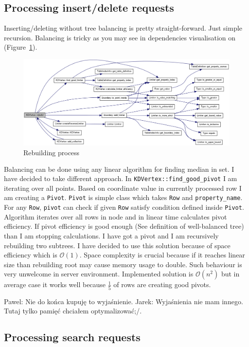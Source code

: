 \documentclass[10pt,a4paper]{article}
\newcommand{\pawel}[1]{\noindent\colorbox{myRed}{Pawel: #1}}
\newcommand{\jarek}[1]{\noindent\colorbox{myYellow}{Jarek: #1}}
\newcommand{\Oh}{\mathcal{O}}
\begin{document}
\subsection{Processing insert/delete requests}

Inserting/deleting without tree balancing is pretty straight-forward. Just simple recursion. Balancing is tricky as you may see in dependencies visualisation on (Figure~\ref{fig:rebuild}).

\begin{figure}
\centering
  \includegraphics[width=16cm]{rebuild}
  \caption{Rebuilding process}
  \label{fig:rebuild}
\end{figure}

Balancing can be done using any linear algorithm for finding median in set. I have decided to take different approach. In \verb|KDVertex::find_good_pivot| I am iterating over all points. Based on coordinate value in currently processed row I am creating a \verb|Pivot|. \verb|Pivot| is simple class which takes \verb|Row| and \verb|property_name|. For any \verb|Row|, \verb|pivot| can check if given \verb|Row| satisfy condition defined inside \verb|Pivot|. Algorithm iterates over all rows in node and in linear time calculates pivot efficiency. If pivot efficiency is good enough (See definition of well-balanced tree) than I am stopping calculations. I have got a pivot and I am recursively rebuilding two subtrees. I have decided to use this solution because of space efficiency which is $\Oh(1)$. Space complexity is crucial because if it reaches linear size than rebuilding root may cause memory usage to double. Such behaviour is very unwelcome in server environment. Implemented solution is $\Oh(n^2)$ but in average case it works well because $\frac{1}{5}$ of rows are creating good pivots.

\pawel{Nie do końca kupuję to wyjaśnienie.}
\jarek{Wyjaśnienia nie mam innego. Tutaj tylko pamięć chciałem optymalizować;/. }

\subsection{Processing search requests}
\end{document}
